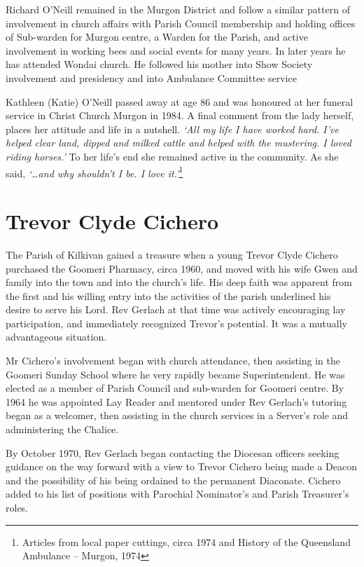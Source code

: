 Richard O'Neill remained in the Murgon District and follow a similar pattern of involvement in church affairs with Parish Council membership and holding offices of Sub-warden for Murgon centre, a Warden for the Parish, and active involvement in working bees and social events for many years. In later years he has attended Wondai church. He followed his mother into Show Society involvement and presidency and into Ambulance Committee service



Kathleen (Katie) O'Neill passed away at age 86 and was honoured at her funeral service in Christ Church Murgon in 1984. A final comment from the lady herself, places her attitude and life in a nutshell. \emph{`All my life I have worked hard. I've helped clear land, dipped and milked cattle and helped with the mustering. I loved riding horses.'} To her life's end she remained active in the community. As she said, \emph{`\ldots and why shouldn't I be. I love it.'}\footnote{Articles from local paper cuttings, circa 1974 and History of the Queensland Ambulance -- Murgon, 1974}


\section{Trevor Clyde Cichero}



The Parish of Kilkivan gained a treasure when a young Trevor Clyde Cichero purchased the Goomeri Pharmacy, circa 1960, and moved with his wife Gwen and family into the town and into the church's life. His deep faith was apparent from the first and his willing entry into the activities of the parish underlined his desire to serve his Lord. Rev Gerlach at that time was actively encouraging lay participation, and immediately recognized Trevor's potential. It was a mutually advantageous situation.



Mr Cichero's involvement began with church attendance, then assisting in the Goomeri Sunday School where he very rapidly became Superintendent. He was elected as a member of Parish Council and sub-warden for Goomeri centre. By 1964 he was appointed Lay Reader and mentored under Rev Gerlach's tutoring began as a welcomer, then assisting in the church services in a Server's role and administering the Chalice.



By October 1970, Rev Gerlach began contacting the Diocesan officers seeking guidance on the way forward with a view to Trevor Cichero being made a Deacon and the possibility of his being ordained to the permanent Diaconate. Cichero added to his list of positions with Parochial Nominator's and Parish Treasurer's roles.



